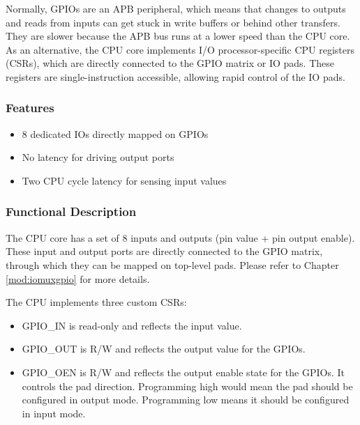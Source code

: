 \documentclass[main\_\_EN.tex]{subfiles}
\begin{document}
Normally, GPIOs are an APB peripheral, which means that changes to outputs and reads from inputs can get stuck in write buffers or behind other transfers. They are slower because the APB bus runs at a lower speed than the CPU core.
As an alternative, the CPU core implements I/O processor-specific CPU registers (CSRs), which are directly connected to the GPIO matrix or IO pads. These registers are single-instruction accessible, allowing rapid control of the IO pads.

\subsubsection{Features}
\label{sec:riscvcpu-fastio-features}
 \begin{itemize}
    \item 8 dedicated IOs directly mapped on GPIOs
    \item No latency for driving output ports
    \item Two CPU cycle latency for sensing input values
\end{itemize}

\subsubsection{Functional Description}
\label{sec:riscvcpu-fastio-func-descr}

The CPU core has a set of 8 inputs and outputs (pin value + pin output enable). These input and output ports are directly connected to the GPIO matrix, through which they can be mapped on top-level pads. Please refer to Chapter \ref{mod:iomuxgpio} \textit{} for more details.

The CPU implements three custom CSRs:
\begin{itemize}
    \item GPIO\_IN is read-only and reflects the input value.
    \item GPIO\_OUT is R/W and reflects the output value for the GPIOs.
    \item GPIO\_OEN is R/W and reflects the output enable state for the GPIOs. It controls the pad direction. Programming high would mean the pad should be configured in output mode. Programming low means it should be configured in input mode.
\end{itemize}


\newpage
\hypertarget{riscvcpu-fastio-reg-summ}{}
\end{document}
